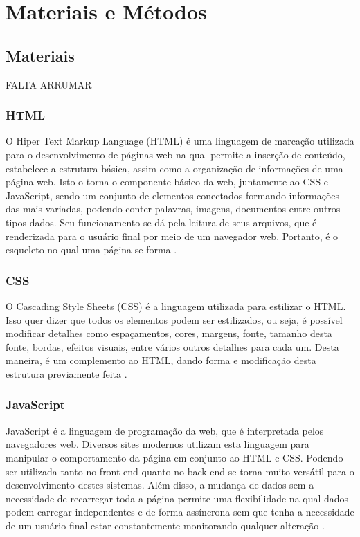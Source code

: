 \chapter{Materiais e Métodos}\label{chp:LABEL_CHP_3}
\section{Materiais}
FALTA ARRUMAR
\subsection{HTML}
O Hiper Text Markup Language (HTML) é uma linguagem de marcação utilizada para o desenvolvimento de páginas web na qual permite a inserção de conteúdo, estabelece a estrutura básica, assim como a organização de informações de uma página web. Isto o torna o componente básico da web, juntamente ao CSS e JavaScript, sendo um conjunto de elementos conectados formando informações das mais variadas, podendo conter palavras, imagens, documentos entre outros tipos dados. Seu funcionamento se dá pela leitura de seus arquivos, que é renderizada para o usuário final por meio de um navegador web. Portanto, é o esqueleto no qual uma página se forma \cite{FLANAGAN}.
\subsection{CSS}
O Cascading Style Sheets (CSS) é a linguagem utilizada para estilizar o HTML. Isso quer dizer que todos os elementos podem ser estilizados, ou seja, é possível modificar detalhes como espaçamentos, cores, margens, fonte, tamanho desta fonte, bordas, efeitos visuais, entre vários outros detalhes para cada um. Desta maneira, é um complemento ao HTML, dando forma e modificação desta estrutura previamente feita \cite{FLANAGAN}.
\subsection{JavaScript}
JavaScript é a linguagem de programação da web, que é interpretada pelos navegadores web. Diversos sites modernos utilizam esta linguagem para manipular o comportamento da página em conjunto ao HTML e CSS. Podendo ser utilizada tanto no front-end quanto no back-end se torna muito versátil para o desenvolvimento destes sistemas. Além disso, a mudança de dados sem a necessidade de recarregar toda a página permite uma flexibilidade na qual dados podem carregar independentes e de forma assíncrona sem que tenha a necessidade de um usuário final estar constantemente monitorando qualquer alteração \cite{FLANAGAN}.
